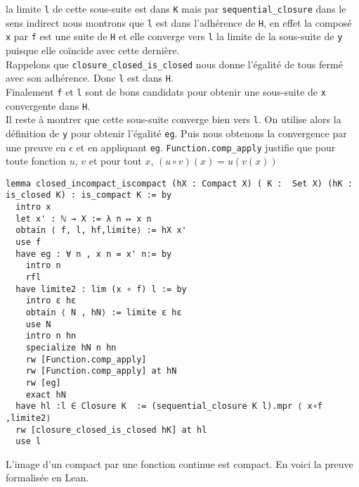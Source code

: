 \documentclass[a4paper, 12pt]{article}
\newcommand{\lean}[1]{\texttt{#1}}
\begin{document}
la limite \lean{l} de cette sous-suite est dans \lean{K} mais par \lean{sequential_closure} dans le sens indirect nous montrons que \lean{l} est dans l'adhérence de \lean{H}, en effet la composé \lean{x} par \lean{f} est une suite de \lean{H} et elle converge vers \lean{l} la limite de la sous-suite de \lean{y} puisque elle coïncide avec cette dernière.\\

Rappelons que \lean{closure_closed_is_closed} nous donne l'égalité de tous fermé avec son adhérence. Donc \lean{l} est dans \lean{H}.\\

Finalement \lean{f} et \lean{l} sont de bons candidats pour obtenir une sous-suite de \lean{x} convergente dans \lean{H}.\\

Il reste à montrer que cette sous-suite converge bien vers \lean{l}. On utilise alors la définition de \lean{y} pour obtenir l'égalité \lean{eg}. Puis nous obtenons la convergence par une preuve en $\epsilon$ et en appliquant \lean{eg}. \lean{Function.comp_apply} justifie que pour toute fonction $u$, $v$ et pour tout $x$, $(u \circ v) (x) = u(v(x)) $ 




\begin{verbatim}
lemma closed_incompact_iscompact (hX : Compact X) ( K :  Set X) (hK : is_closed K) : is_compact K := by
  intro x
  let x' : ℕ → X := λ n ↦ x n
  obtain ⟨ f, l, hf,limite⟩ := hX x'
  use f 
  have eg : ∀ n , x n = x' n:= by
    intro n
    rfl
  have limite2 : lim (x ∘ f) l := by
    intro ε hε 
    obtain ⟨ N , hN⟩ := limite ε hε 
    use N 
    intro n hn
    specialize hN n hn
    rw [Function.comp_apply]
    rw [Function.comp_apply] at hN
    rw [eg]
    exact hN
  have hl :l ∈ Closure K  := (sequential_closure K l).mpr ⟨ x∘f ,limite2⟩ 
  rw [closure_closed_is_closed hK] at hl
  use l
\end{verbatim}



\vspace{\baselineskip} 

L'image d'un compact par une fonction continue est compact. En voici la preuve formalisée en Lean.
\end{document}
